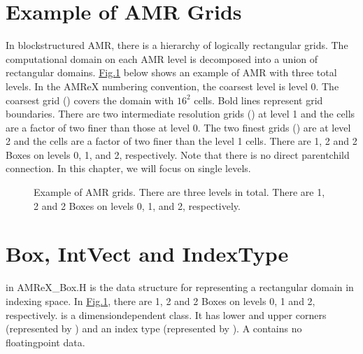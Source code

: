 \documentclass[letterpaper,10pt,english]{sphinxmanual}
\begin{document}
\section{Example of AMR Grids}
\label{\detokenize{Basics:example-of-amr-grids}}\label{\detokenize{Basics:sec-basics-amrgrids}}
\sphinxAtStartPar
In block\sphinxhyphen{}structured AMR, there is a hierarchy of logically rectangular grids.
The computational domain on each AMR level is decomposed into a union of
rectangular domains. \hyperref[\detokenize{Basics:fig-basics-amrgrids}]{Fig.\@ \ref{\detokenize{Basics:fig-basics-amrgrids}}} below shows an example of
AMR with three total levels.  In the AMReX numbering convention, the coarsest
level is level 0. The coarsest grid () covers the domain with
\(16^2\) cells. Bold lines represent grid boundaries. There are two
intermediate resolution grids () at level 1 and the cells are a factor of
two finer than those at level 0. The two finest grids () are at level 2
and the cells are a factor of two finer than the level 1 cells. There are 1, 2
and 2 Boxes on levels 0, 1, and 2, respectively. Note that there is no direct
parent\sphinxhyphen{}child connection. In this chapter, we will focus on single levels.

\begin{center}

\begin{figure}[htbp]
\centering
\capstart

\noindent{}
\caption{Example of AMR grids. There are three levels in total.
There are 1, 2 and 2 Boxes on levels 0, 1, and 2, respectively.}\label{\detokenize{Basics:id1}}\label{\detokenize{Basics:fig-basics-amrgrids}}\end{figure}

\end{center}


\section{Box, IntVect and IndexType}
\label{\detokenize{Basics:box-intvect-and-indextype}}\label{\detokenize{Basics:sec-basics-box}}
\sphinxAtStartPar
{} in AMReX\_Box.H is the data structure for representing a rectangular
domain in indexing space.  In \hyperref[\detokenize{Basics:fig-basics-amrgrids}]{Fig.\@ \ref{\detokenize{Basics:fig-basics-amrgrids}}}, there are 1, 2 and
2 Boxes on levels 0, 1 and 2, respectively.   is a
dimension\sphinxhyphen{}dependent class. It has lower and upper corners (represented by
) and an index type (represented by ). A
 contains no floating\sphinxhyphen{}point data.
\end{document}
